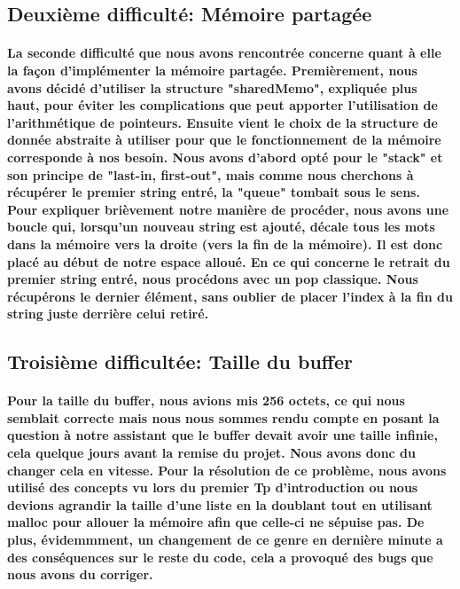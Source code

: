 \documentclass[utf8]{article}
\begin{document}
\subsection{Deuxième difficulté: Mémoire partagée}
\paragraph{La seconde difficulté que nous avons rencontrée concerne quant à elle la façon d'implémenter la mémoire partagée. Premièrement, nous avons décidé
d'utiliser la structure "sharedMemo", expliquée plus haut, pour éviter les complications que peut apporter l'utilisation de l'arithmétique de pointeurs. Ensuite
vient le choix de la structure de donnée abstraite à utiliser pour que le fonctionnement de la mémoire corresponde à nos besoin. Nous avons d'abord opté pour
le "stack" et son principe de "last-in, first-out", mais comme nous cherchons à récupérer le premier string entré, la "queue" tombait sous le sens. Pour expliquer
brièvement notre manière de procéder, nous avons une boucle qui, lorsqu'un nouveau string est ajouté, décale tous les mots dans la mémoire vers la droite (vers la 
fin de la mémoire). Il est donc placé au début de notre espace alloué. En ce qui concerne le retrait du premier string entré, nous procédons avec un pop classique. Nous 
récupérons le dernier élément, sans oublier de placer l'index à la fin du string juste derrière celui retiré.}

\subsection{Troisième difficultée: Taille du buffer}
\paragraph{Pour la taille du buffer, nous avions mis 256 octets, ce qui nous semblait correcte mais 
nous nous sommes rendu compte en posant la question à notre assistant que le buffer devait avoir une taille infinie,
cela quelque jours avant la remise du projet. Nous avons donc du changer cela en vitesse. Pour la résolution de ce problème,
nous avons utilisé des concepts vu lors du premier Tp d'introduction ou nous devions agrandir la taille d'une 
liste en la doublant tout en utilisant malloc pour allouer la mémoire afin que celle-ci ne sépuise pas.
De plus, évidemmment, un changement de ce genre en dernière minute a des conséquences sur le reste du code, cela a provoqué 
des bugs que nous avons du corriger.}
\end{document}
